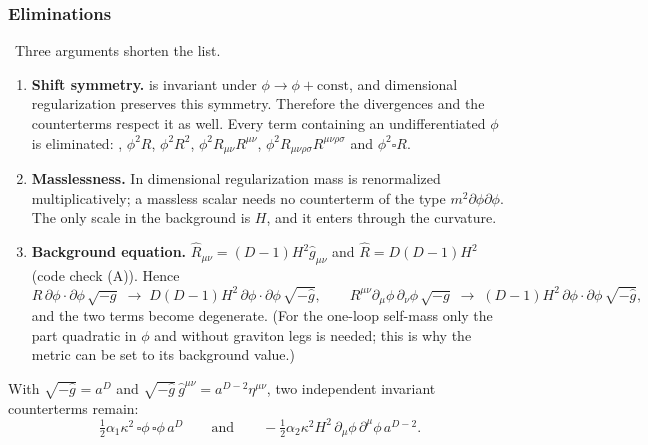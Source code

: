 \subsubsection{Eliminations}
\tA{}\,\tD{} Three arguments shorten the list.
\begin{enumerate}[leftmargin=18pt]
\item \textbf{Shift symmetry.}  is invariant under $\phi\to\phi+\text{const}$, and dimensional regularization preserves this symmetry.
Therefore the divergences and the counterterms respect it as well.
Every term containing an undifferentiated $\phi$ is eliminated:
, $\phi^2R$, $\phi^2R^2$, $\phi^2R_{\mu\nu}R^{\mu\nu}$, $\phi^2R_{\mu\nu\rho\sigma}R^{\mu\nu\rho\sigma}$ and $\phi^2\square R$.
\item \textbf{Masslessness.} In dimensional regularization mass is renormalized multiplicatively; a massless scalar needs no counterterm of the type $m^2\partial\phi\partial\phi$.
The only scale in the background is $H$, and it enters through the curvature.
\item \textbf{Background equation.} $\hat R_{\mu\nu}=(D-1)H^2\hat g_{\mu\nu}$ and $\hat R=D(D-1)H^2$ (code check (A)).
Hence
\begin{equation*}
R\,\partial\phi\cdot\partial\phi\,\sqrt{-g}\;\to\;D(D-1)H^2\,\partial\phi\cdot\partial\phi\,\sqrt{-\hat g},\qquad
R^{\mu\nu}\partial_\mu\phi\,\partial_\nu\phi\,\sqrt{-g}\;\to\;(D-1)H^2\,\partial\phi\cdot\partial\phi\,\sqrt{-\hat g},
\end{equation*}
and the two terms become degenerate.
(For the one-loop self-mass only the part quadratic in $\phi$ and without graviton legs is needed; this is why the metric can be set to its background value.)
\end{enumerate}
With $\sqrt{-\hat g}=a^D$ and $\sqrt{-\hat g}\,\hat g^{\mu\nu}=a^{D-2}\eta^{\mu\nu}$, two independent invariant counterterms remain:
\begin{equation*}
\tfrac12\alpha_1\kappa^2\,\square\phi\,\square\phi\,a^D\qquad\text{and}\qquad-\tfrac12\alpha_2\kappa^2H^2\,\partial_\mu\phi\,\partial^\mu\phi\,a^{D-2}.
\tag{I.129}
\end{equation*}

